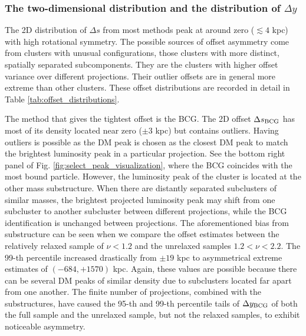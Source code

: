 \subsubsection{The two-dimensional distribution and the distribution of $\Delta y$}
The 2D distribution of $\Delta s$ from most methods peak at
around zero ($\lesssim 4$ kpc) with high rotational symmetry. 
The possible sources of offset asymmetry come from clusters with unusual configurations,
those clusters with more distinct, spatially separated subcomponents.
They are the clusters with higher offset variance over different projections. 
Their outlier offsets are in general more extreme than other clusters.
These offset distributions are recorded in detail in Table
\ref{tab:offset_distributions}. 

The method that gives the tightest offset is the BCG. 
The 2D offset $\Delta s_{\rm BCG}$ has most of its density located near zero
($\pm 3$ kpc) but 
contains outliers. Having outliers is possible 
as the DM peak is chosen as the closest DM peak to match the
brightest luminosity peak in a particular projection.
See the bottom right panel of Fig. \ref{fig:select_peak_visualization}, where the BCG 
coincides with the most bound particle. However, the luminosity peak of the
cluster is located at the other mass substructure. 
When there are distantly separated subclusters of similar masses, 
the brightest projected luminosity peak 
may shift from one subcluster to another subcluster between different projections,
while the BCG identification is unchanged between projections.
The aforementioned bias from substructure can be seen when we compare the
offset estimates between the relatively relaxed sample of $\nu < 1.2$ and the
unrelaxed samples $1.2 < \nu < 2.2$. The 99-th percentile increased drastically
from $\pm 19$ kpc to asymmetrical extreme estimates of $(-684, +1570)$ kpc.
Again, these values are possible because there can be several DM peaks of
similar density due to subclusters located far apart from one another.
The finite number of projections, combined with the substructures, have caused 
the 95-th and 99-th percentile tails of $\Delta y_{\rm BCG}$ of both the full
sample and the unrelaxed sample, but not the relaxed samples, to exhibit 
noticeable asymmetry.

